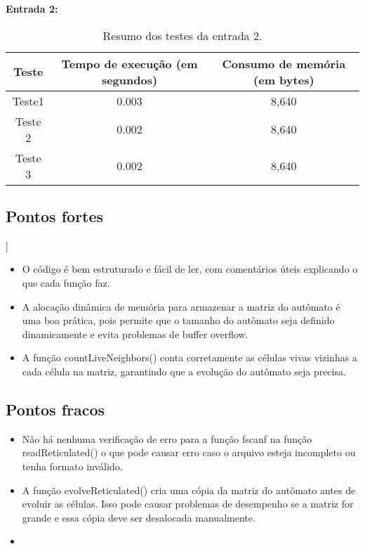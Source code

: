 \documentclass{article}
\begin{document}
\noindent \textbf{Entrada 2:}
\begin{table}[!htb]
    \centering
    \begin{tabular}{|c | c | c |}
        \hline
        Teste & Tempo de execução (em segundos) & Consumo de memória (em bytes) \\\hline
        Teste1 & 0.003 & 8,640  \\\hline
        Teste 2 & 0.002 & 8,640 \\\hline
        Teste 3 & 0.002 & 8,640 \\\hline
    \end{tabular}
    \caption{\label{tab:widgets}Resumo dos testes da entrada 2.}
\end{table}

\subsection{Pontos fortes}
\DESCRICAO{}]

\begin{itemize}
\item O código é bem estruturado e fácil de ler, com comentários úteis explicando o que cada função faz.
\item A alocação dinâmica de memória para armazenar a matriz do autômato é uma boa prática, pois permite que o tamanho do autômato seja definido dinamicamente e evita problemas de buffer overflow.
\item A função countLiveNeighbors() conta corretamente as células vivas vizinhas a cada célula na matriz, garantindo que a evolução do autômato seja precisa.
\end{itemize}

\subsection{Pontos fracos}
\DESCRICAO{}

\begin{itemize}
\item Não há nenhuma verificação de erro para a função fscanf na função readReticulated() o que pode causar erro caso o arquivo esteja incompleto ou tenha formato inválido.
\item A função evolveReticulated() cria uma cópia da matriz do autômato antes de evoluir as células. Isso pode causar problemas de desempenho se a matriz for grande e essa cópia deve ser desalocada manualmente.
\item 
\end{itemize}
\end{document}

